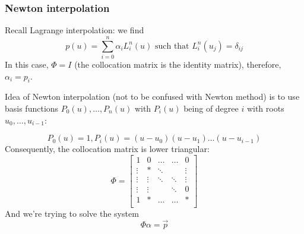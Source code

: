 \subsubsection{Newton interpolation}
Recall Lagrange interpolation: we find
\[
    p(u) = \sum_{i=0}^n \alpha_i L_i^n(u) \text{ such that } L_i^n(u_j) = \delta_{ij}
\]
In this case, $\Phi = I$ (the collocation matrix is the identity matrix), 
therefore, $\alpha_i = p_i$. 

Idea of Newton interpolation (not to be confused with Newton method)
is to use basis functions
$P_0(u), \dots, P_n(u)$ with $P_i(u)$ being of degree $i$
with roots $u_0, \dots, u_{i - 1}$:

\[
    P_0(u) = 1, P_i(u) = (u - u_0)(u - u_1) \dots (u - u_{i - 1})
\]
Consequently, the collocation matrix is lower triangular:
\[
    \Phi = \begin{bmatrix}
        1 & 0 & \dots & \dots& 0\\
        \vdots & * & \ddots & & \vdots\\
        \vdots & \vdots & \ddots & \ddots & \vdots\\
        \vdots & \vdots & & \ddots & 0\\
        1 & * & \dots & \dots & *\\
    \end{bmatrix}
\]
And we're trying to solve the system
\[ \Phi \alpha = \vec{p} \]
